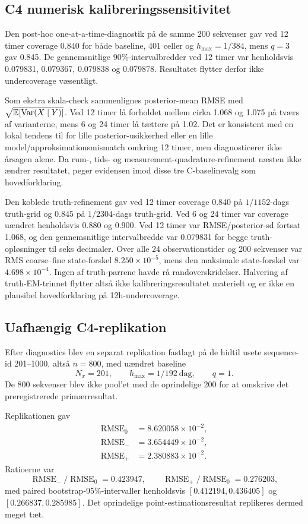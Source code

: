 \subsection{C4 numerisk kalibreringssensitivitet}
Den post-hoc one-at-a-time-diagnostik på de samme 200 sekvenser gav ved 12 timer
coverage 0.840 for både baseline, 401 celler og \(h_{\max}=1/384\), mens
\(q=3\) gav 0.845. De gennemsnitlige 90\%-intervalbredder ved 12 timer var
henholdsvis 0.079831, 0.079367, 0.079838 og 0.079878. Resultatet flytter derfor
ikke undercoverage væsentligt.

Som ekstra skala-check sammenlignes posterior-mean RMSE med
\(\sqrt{\mathbb E[\operatorname{Var}(X\mid Y)]}\). Ved 12 timer lå forholdet mellem cirka 1.068
og 1.075 på tværs af varianterne, mens 6 og 24 timer lå tættere på 1.02.
Det er konsistent med en lokal tendens til for lille posterior-usikkerhed eller
en lille model/approksimationsmismatch omkring 12 timer, men diagnosticerer ikke
årsagen alene. Da rum-, tids- og measurement-quadrature-refinement næsten ikke
ændrer resultatet, peger evidensen imod disse tre C-baselinevalg som hovedforklaring.

Den koblede truth-refinement gav ved 12 timer coverage 0.840 på
\(1/1152\)-dags truth-grid og 0.845 på \(1/2304\)-dags truth-grid. Ved 6 og
24 timer var coverage uændret henholdsvis 0.880 og 0.900. Ved 12 timer var
RMSE/posterior-sd fortsat 1.068, og den gennemsnitlige intervalbredde var 0.079831
for begge truth-opløsninger til seks decimaler. Over alle 24 observationstider og
200 sekvenser var RMS coarse--fine state-forskel \(8.250\times10^{-5}\), mens den
maksimale state-forskel var \(4.698\times10^{-4}\). Ingen af truth-parrene havde
rå randoverskridelser. Halvering af truth-EM-trinnet flytter altså ikke
kalibreringsresultatet materielt og er ikke en plausibel hovedforklaring på
12h-undercoverage.

\subsection{Uafhængig C4-replikation}
Efter diagnostics blev en separat replikation fastlagt på de hidtil usete
sequence-id 201--1000, altså \(n=800\), med uændret baseline
\[
 N_x=201,\qquad h_{\max}=1/192\ \text{dag},\qquad q=1.
\]
De 800 sekvenser blev ikke pool'et med de oprindelige 200 for at omskrive det
preregistrerede primærresultat.

Replikationen gav
\begin{align}
 \operatorname{RMSE}_0 &= 8.620058\times10^{-2},\\
 \operatorname{RMSE}_- &= 3.654449\times10^{-2},\\
 \operatorname{RMSE}_+ &= 2.380883\times10^{-2}.
\end{align}
Ratioerne var
\[
 \operatorname{RMSE}_-/\operatorname{RMSE}_0=0.423947,\qquad
 \operatorname{RMSE}_+/\operatorname{RMSE}_0=0.276203,
\]
med paired bootstrap-95\%-intervaller henholdsvis
\([0.412194,0.436405]\) og \([0.266837,0.285985]\). Det oprindelige
point-estimationsresultat replikeres dermed meget tæt.

